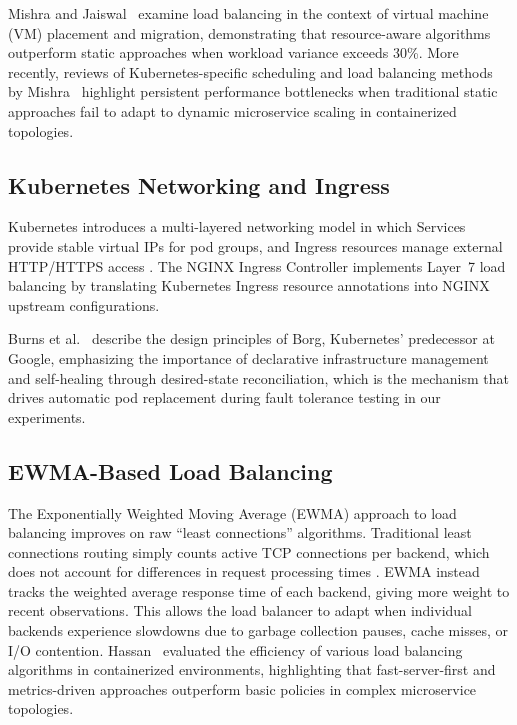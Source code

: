 \documentclass[conference]{IEEEtran}
\begin{document}
Mishra and Jaiswal~\cite{mishra2012load} examine load balancing in the context of virtual machine (VM) placement and migration, demonstrating that resource-aware algorithms outperform static approaches when workload variance exceeds 30\%. More recently, reviews of Kubernetes-specific scheduling and load balancing methods by Mishra~\cite{mishra2023review} highlight persistent performance bottlenecks when traditional static approaches fail to adapt to dynamic microservice scaling in containerized topologies.

\subsection{Kubernetes Networking and Ingress}
Kubernetes introduces a multi-layered networking model in which Services provide stable virtual IPs for pod groups, and Ingress resources manage external HTTP/HTTPS access \cite{k8s_docs}. The NGINX Ingress Controller implements Layer~7 load balancing by translating Kubernetes Ingress resource annotations into NGINX upstream configurations.

Burns et al.~\cite{burns2016borg} describe the design principles of Borg, Kubernetes' predecessor at Google, emphasizing the importance of declarative infrastructure management and self-healing through desired-state reconciliation, which is the mechanism that drives automatic pod replacement during fault tolerance testing in our experiments.

\subsection{EWMA-Based Load Balancing}
The Exponentially Weighted Moving Average (EWMA) approach to load balancing improves on raw ``least connections'' algorithms. Traditional least connections routing simply counts active TCP connections per backend, which does not account for differences in request processing times \cite{cardellini1999dynamic}. EWMA instead tracks the weighted average response time of each backend, giving more weight to recent observations. This allows the load balancer to adapt when individual backends experience slowdowns due to garbage collection pauses, cache misses, or I/O contention. Hassan~\cite{hassan2025assessing} evaluated the efficiency of various load balancing algorithms in containerized environments, highlighting that fast-server-first and metrics-driven approaches outperform basic policies in complex microservice topologies.
\end{document}
